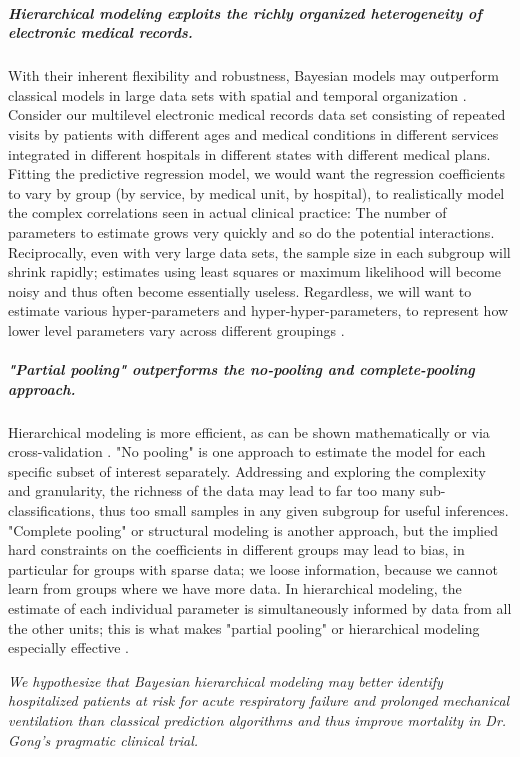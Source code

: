 \documentclass[11pt,notitlepage]{article}
\begin{document}
\subparagraph{Hierarchical modeling exploits the richly organized heterogeneity of electronic medical records.}
With their inherent flexibility and robustness, Bayesian models may outperform classical models in large data sets with spatial and temporal organization \cite{Gelman_red_2009}. Consider our multilevel electronic medical records data set consisting of repeated visits by patients with different ages and medical conditions in different services integrated in different hospitals in different states with different medical plans. Fitting the predictive regression model, we would want the regression coefficients to vary by group (by service, by medical unit, by hospital), to realistically model the complex correlations seen in actual clinical practice: The number of parameters to estimate grows very quickly and so do the potential interactions. Reciprocally, even with very large data sets, the sample size in each subgroup will shrink rapidly; estimates using least squares or maximum likelihood will become noisy and thus often become essentially useless. Regardless, we  will want to estimate various hyper-parameters and hyper-hyper-parameters, to represent how lower level parameters vary across different groupings \cite{Bafumi_Gelman_2007}.

\subparagraph*{"Partial pooling" outperforms the no-pooling and complete-pooling approach.}
Hierarchical modeling is more efficient, as can be shown mathematically or via cross-validation \cite{Gelman-Hill_2014}. "No pooling" is one approach to estimate the model for each specific subset of interest separately. Addressing and exploring the complexity and granularity, the richness of the data may lead to far too many sub-classifications, thus too small samples in any given subgroup for useful inferences. "Complete pooling" or structural modeling is another approach, but the implied hard constraints on the coefficients in different groups may lead to bias, in particular for groups with sparse data; we loose information, because we cannot learn from groups where we have more data. In hierarchical modeling, the estimate of each individual parameter is simultaneously informed by data from all the other units; this is what makes "partial pooling" or hierarchical modeling especially effective \cite{Gelman_multilevel_2006}. \newline

\emph{We hypothesize that Bayesian hierarchical modeling may better identify hospitalized patients at risk for acute respiratory failure and prolonged mechanical ventilation than classical prediction algorithms and thus improve mortality in Dr. Gong's pragmatic clinical trial.}
\end{document}
